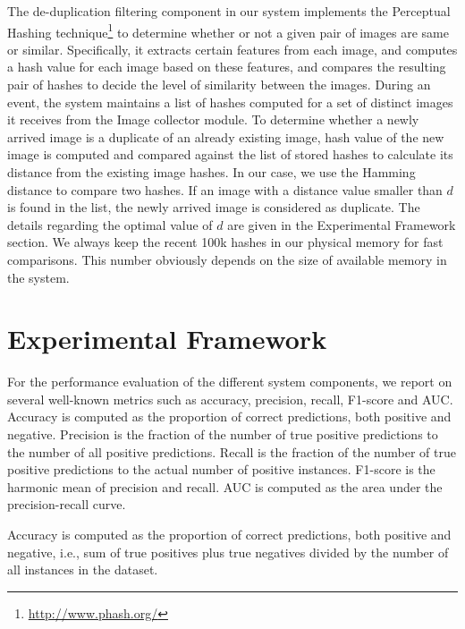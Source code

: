 \documentclass{iscram}
\begin{document}
The de-duplication filtering component in our system implements the Perceptual Hashing technique\footnote{\url{http://www.phash.org/}} to determine whether or not a given pair of images are same or similar. Specifically, it extracts certain features from each image, and computes a hash value for each image based on these features, and compares the resulting pair of hashes to decide the level of similarity between the images. During an event, the system maintains a list of hashes computed for a set of distinct images it receives from the Image collector module. To determine whether a newly arrived image is a duplicate of an already existing image, hash value of the new image is computed and compared against the list of stored hashes to calculate its distance from the existing image hashes. In our case, we use the Hamming distance to compare two hashes. If an image with a distance value smaller than $d$ is found in the list, the newly arrived image is considered as duplicate. The details regarding the optimal value of $d$ are given in the Experimental Framework section. We always keep the recent 100k hashes in our physical memory for fast comparisons. This number obviously depends on the size of available memory in the system.


\section{Experimental Framework}

For the performance evaluation of the different system components, we report on several well-known metrics such as accuracy, precision, recall, F1-score and AUC. Accuracy is computed as the proportion of correct predictions, both positive and negative. Precision is the fraction of the number of true positive predictions to the number of all positive predictions. Recall is the fraction of the number of true positive predictions to the actual number of positive instances. F1-score is the harmonic mean of precision and recall. AUC is computed as the area under the precision-recall curve.

Accuracy is computed as the proportion of correct predictions, both positive and negative, i.e., sum of true positives plus true negatives divided by the number of all instances in the dataset.
\end{document}
